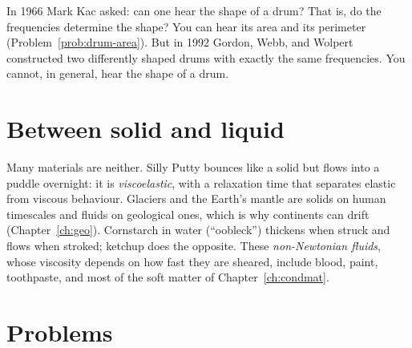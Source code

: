 In 1966 Mark Kac asked: can one hear the shape of a drum? That is, do the frequencies determine the shape? You can hear its area and its perimeter (Problem~\ref{prob:drum-area}). But in 1992 Gordon, Webb, and Wolpert constructed two differently shaped drums with exactly the same frequencies. You cannot, in general, hear the shape of a drum.

\section{Between solid and liquid}

Many materials are neither. Silly Putty bounces like a solid but flows into a puddle overnight: it is \emph{viscoelastic}, with a relaxation time that separates elastic from viscous behaviour. Glaciers and the Earth's mantle are solids on human timescales and fluids on geological ones, which is why continents can drift (Chapter~\ref{ch:geo}). Cornstarch in water (``oobleck'') thickens when struck and flows when stroked; ketchup does the opposite. These \emph{non-Newtonian fluids}, whose viscosity depends on how fast they are sheared, include blood, paint, toothpaste, and most of the soft matter of Chapter~\ref{ch:condmat}.

\section{Problems}

